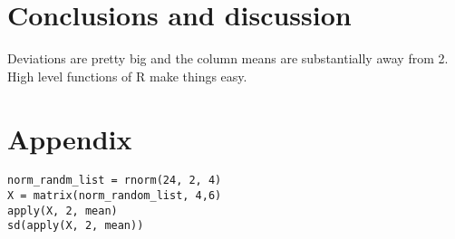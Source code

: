 \documentclass[a4paper,10pt]{article}
\begin{document}
\section{Conclusions and discussion}
Deviations are pretty big and the column means are substantially away from 2. High level functions of R make things easy.

\section{Appendix}
\label{appendix}
\begin{verbatim}
norm_randm_list = rnorm(24, 2, 4)
X = matrix(norm_random_list, 4,6)
apply(X, 2, mean)
sd(apply(X, 2, mean))
\end{verbatim}
\end{document}
